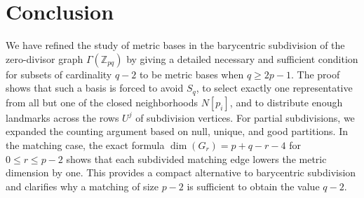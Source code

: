 \documentclass[12pt]{article}
\begin{document}
\section{Conclusion}\label{sect con}

We have refined the study of metric bases in the barycentric subdivision of the zero-divisor graph $\Gamma(\mathbb Z_{pq})$ by giving a detailed necessary and sufficient condition for subsets of cardinality $q-2$ to be metric bases when $q\geq 2p-1$. The proof shows that such a basis is forced to avoid $S_q$, to select exactly one representative from all but one of the closed neighborhoods $N[p_i]$, and to distribute enough landmarks across the rows $U^j$ of subdivision vertices. For partial subdivisions, we expanded the counting argument based on null, unique, and good partitions. In the matching case, the exact formula $\dim(G_r)=p+q-r-4$ for $0\leq r\leq p-2$ shows that each subdivided matching edge lowers the metric dimension by one. This provides a compact alternative to barycentric subdivision and clarifies why a matching of size $p-2$ is sufficient to obtain the value $q-2$.
\end{document}
